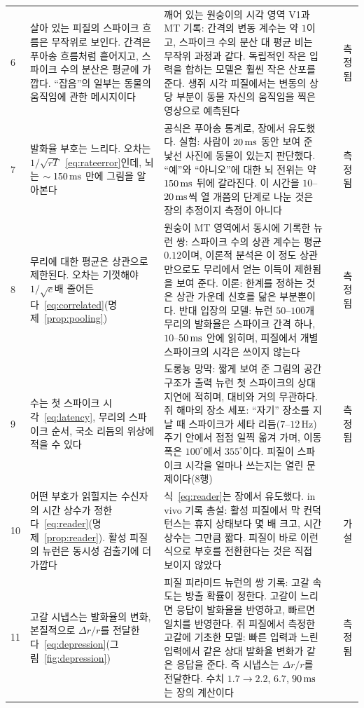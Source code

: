 {\begin{longtable}{>{\raggedright}p{0.5cm}>{\raggedright}p{4.0cm}>{\raggedright}p{5.6cm}>{\raggedright}p{2.3cm}>{\raggedright\arraybackslash}p{1.7cm}}
6 & 살아 있는 피질의 스파이크 흐름은 무작위로 보인다. 간격은 푸아송 흐름처럼 흩어지고, 스파이크 수의 분산은 평균에 가깝다. “잡음”의 일부는 동물의 움직임에 관한 메시지이다 & 깨어 있는 원숭이의 시각 영역 V1과 MT 기록: 간격의 변동 계수는 약 $1$이고, 스파이크 수의 분산 대 평균 비는 무작위 과정과 같다. 독립적인 작은 입력을 합하는 모델은 훨씬 작은 산포를 준다. 생쥐 시각 피질에서는 변동의 상당 부분이 동물 자신의 움직임을 찍은 영상으로 예측된다 & \cite{Softky1993,Stringer2019} & 측정됨 \\
7 & 발화율 부호는 느리다. 오차는 $1/\sqrt{rT}$~\eqref{eq:rateerror}인데, 뇌는 $\sim150\,\text{ms}$ 만에 그림을 알아본다 & 공식은 푸아송 통계로, 장에서 유도했다. 실험: 사람이 $20\,\text{ms}$ 동안 보여 준 낯선 사진에 동물이 있는지 판단했다. “예”와 “아니오”에 대한 뇌 전위는 약 $150\,\text{ms}$ 뒤에 갈라진다. 이 시간을 $10$--$20\,\text{ms}$씩 열 개쯤의 단계로 나눈 것은 장의 추정이지 측정이 아니다 & \cite{Thorpe1996} & 측정됨 \\
8 & 무리에 대한 평균은 상관으로 제한된다. 오차는 기껏해야 $1/\sqrt c$배 줄어든다~\eqref{eq:correlated}(명제~\ref{prop:pooling}) & 원숭이 MT 영역에서 동시에 기록한 뉴런 쌍: 스파이크 수의 상관 계수는 평균 $0.12$이며, 이론적 분석은 이 정도 상관만으로도 무리에서 얻는 이득이 제한됨을 보여 준다. 이론: 한계를 정하는 것은 상관 가운데 신호를 닮은 부분뿐이다. 반대 입장의 모델: 뉴런 $50$--$100$개 무리의 발화율은 스파이크 간격 하나, $10$--$50\,\text{ms}$ 안에 읽히며, 피질에서 개별 스파이크의 시각은 쓰이지 않는다 & \cite{Zohary1994,MorenoBote2014,ShadlenNewsome1998} & 측정됨 \\
9 & 수는 첫 스파이크 시각~\eqref{eq:latency}, 무리의 스파이크 순서, 국소 리듬의 위상에 적을 수 있다 & 도롱뇽 망막: 짧게 보여 준 그림의 공간 구조가 출력 뉴런 첫 스파이크의 상대 지연에 적히며, 대비와 거의 무관하다. 쥐 해마의 장소 세포: “자기” 장소를 지날 때 스파이크가 세타 리듬($7$--$12$\,Hz) 주기 안에서 점점 일찍 옮겨 가며, 이동 폭은 $100^\circ$에서 $355^\circ$이다. 피질이 스파이크 시각을 얼마나 쓰는지는 열린 문제이다(8행) & \cite{Gollisch2008,OKeefe1993} & 측정됨 \\
10 & 어떤 부호가 읽힐지는 수신자의 시간 상수가 정한다~\eqref{eq:reader}(명제~\ref{prop:reader}). 활성 피질의 뉴런은 동시성 검출기에 더 가깝다 & 식~\eqref{eq:reader}는 장에서 유도했다. in vivo 기록 총설: 활성 피질에서 막 컨덕턴스는 휴지 상태보다 몇 배 크고, 시간 상수는 그만큼 짧다. 피질이 바로 이런 식으로 부호를 전환한다는 것은 직접 보이지 않았다 & \cite{Destexhe2003} & 가설 \\
11 & 고갈 시냅스는 발화율의 변화, 본질적으로 $\Delta r/r$를 전달한다~\eqref{eq:depression}(그림~\ref{fig:depression}) & 피질 피라미드 뉴런의 쌍 기록: 고갈 속도는 방출 확률이 정한다. 고갈이 느리면 응답이 발화율을 반영하고, 빠르면 일치를 반영한다. 쥐 피질에서 측정한 고갈에 기초한 모델: 빠른 입력과 느린 입력에서 같은 상대 발화율 변화가 같은 응답을 준다. 즉 시냅스는 $\Delta r/r$를 전달한다. 수치 $1.7\to2.2$, $6.7$, $90\,\text{ms}$는 장의 계산이다 & \cite{Tsodyks1997,Abbott1997depression} & 측정됨 \\

\end{longtable}}
